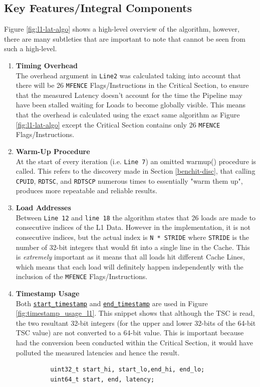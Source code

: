 \documentclass[bsc,frontabs,twoside,singlespacing,parskip,deptreport]{infthesis}     %
\begin{document}
\subsection{Key Features/Integral Components}\label{sec:l1-lat-key-comp}
Figure \ref{fig:l1-lat-algo} shows a high-level overview of the algorithm, however, there are many subtleties that are important to note that cannot be seen from such a high-level.
\begin{enumerate}
    \item{{\bf Timing Overhead} \\
    The overhead argument in \texttt{Line2} was calculated taking into account that there will be 26 \texttt{MFENCE} Flags/Instructions in the Critical Section, to ensure that the measured Latency doesn't account for the time the Pipeline may have been stalled waiting for Loads to become globally visible. This means that the overhead is calculated using the exact same algorithm as Figure \ref{fig:l1-lat-algo} except the Critical Section contains only 26 \texttt{MFENCE} Flags/Instructions.}\label{timing-overhead-consideration-L1}
    
    \item{{\bf Warm-Up Procedure} \\
    At the start of every iteration (i.e. \texttt{Line 7}) an omitted warmup() procedure is called. This refers to the discovery made in Section \ref{benchit-disc}, that calling \texttt{CPUID}, \texttt{RDTSC}, and \texttt{RDTSCP} numerous times to essentially "warm them up", produces more repeatable and reliable results. }
    
    \item{{\bf Load Addresses} \\
    Between \texttt{Line 12} and \texttt{line 18} the algorithm states that 26 loads are made to consecutive indices of the L1 Data. However in the implementation, it is not consecutive indices, but the actual index is \texttt{N * STRIDE} where \texttt{STRIDE} is the number of 32-bit integers that would fit into a single line in the Cache. This is \emph{extremely} important as it means that all loads hit different Cache Lines, which means that each load will definitely happen independently with the inclusion of the \texttt{MFENCE} Flags/Instructions.}
    
    \item{{\bf Timestamp Usage} \\
    Both \hyperref[fig:starttimestamp-code]{\texttt{start\_timestamp}} and \hyperref[fig:endtimestamp-code]{\texttt{end\_timestamp}} are used in Figure \ref{fig:timestamp_usage_l1}. This snippet shows that although the TSC is read, the two resultant 32-bit integers (for the upper and lower 32-bits of the 64-bit TSC value) are not converted to a 64-bit value. This is important because had the conversion been conducted within the Critical Section, it would have polluted the measured latencies and hence the result.
    \begin{figure}[h!]
        \centering
        \begin{verbatim}
    uint32_t start_hi, start_lo,end_hi, end_lo;
    uint64_t start, end, latency;
    

\end{verbatim}
\end{figure}}
\end{enumerate}
\end{document}

